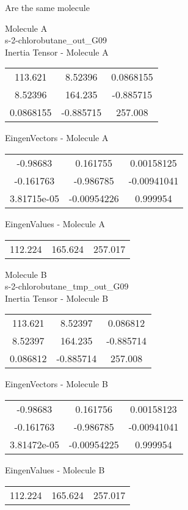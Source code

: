 \begin{center}
\vtab
\vtab
\textcolor{NavyBlue}{\Large Are the same molecule}
\end{center}
\newpage
\begin{multicols}{2}
\begin{center}
Molecule A \\ 
s-2-chlorobutane\_out\_G09
\\
Inertia Tensor - Molecule A \\
\vtab
\begin{tabular}{|c c c|}
113.621	 & 	8.52396	 & 	0.0868155	 \\
8.52396	 & 	164.235	 & 	-0.885715	 \\
0.0868155	 & 	-0.885715	 & 	257.008
\end{tabular}

\vtab
 EingenVectors - Molecule A     \\
\vtab
\begin{tabular}{|c c c|}
-0.98683	 & 	0.161755	 & 	0.00158125	 \\
-0.161763	 & 	-0.986785	 & 	-0.00941041	 \\
3.81715e-05	 & 	-0.00954226	 & 	0.999954
\end{tabular}

\vtab
 EingenValues - Molecule A     \\
\vtab
\begin{tabular}{|c c c|}
112.224	 & 	165.624	 & 	257.017
\end{tabular}
\columnbreak

Molecule B \\ 
s-2-chlorobutane\_tmp\_out\_G09
\\
Inertia Tensor - Molecule B \\
\vtab
\begin{tabular}{|c c c|}
113.621	 & 	8.52397	 & 	0.086812	 \\
8.52397	 & 	164.235	 & 	-0.885714	 \\
0.086812	 & 	-0.885714	 & 	257.008
\end{tabular}

\vtab
 EingenVectors - Molecule B     \\
\vtab
\begin{tabular}{|c c c|}
-0.98683	 & 	0.161756	 & 	0.00158123	 \\
-0.161763	 & 	-0.986785	 & 	-0.00941041	 \\
3.81472e-05	 & 	-0.00954225	 & 	0.999954
\end{tabular}

\vtab
 EingenValues - Molecule B     \\
\vtab
\begin{tabular}{|c c c|}
112.224	 & 	165.624	 & 	257.017
\end{tabular}

\end{center}
\end{multicols}
